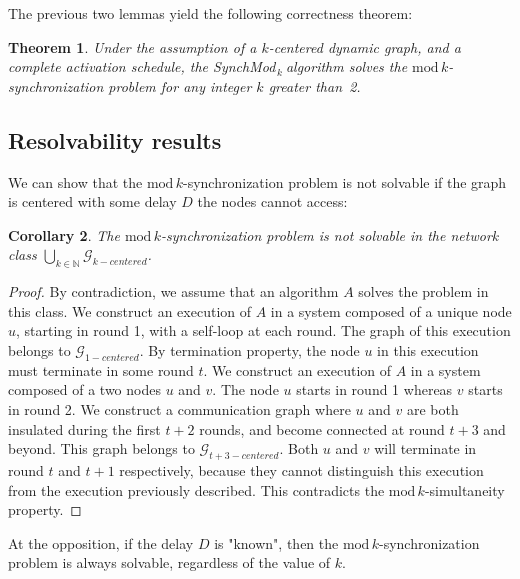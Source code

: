 \documentclass[11pt,letterpaper]{article}
\newtheorem{thm}{Theorem}
\newtheorem{cor}[thm]{Corollary}
\newcommand{\SM}{{\em SynchMod}$_{\,k}\ $}
\begin{document}
The previous two lemmas yield the following correctness theorem:

\begin{thm} \label{lem:safety} 
	Under the assumption of a $k$-centered dynamic graph, and a complete activation schedule,
	the \SM algorithm solves the $\mathrm{mod}\,k$-synchronization problem for any integer $k$ greater than~2.
\end{thm}

\subsection{Resolvability results}

We can show that the $\mathrm{mod}\,k$-synchronization problem is not solvable if the graph is centered with some delay $D$ the nodes cannot access:

\begin{cor}
	The $\mathrm{mod}\,k$-synchronization problem is not solvable in the network class $\underset{k \in \mathds{N}}{\bigcup} \mathcal{G}_{k-centered}$.
\end{cor}
\begin{proof}
	By contradiction, we assume that an algorithm $A$ solves the problem in this class.
	We construct an execution of $A$ in a system composed of a unique node $u$, starting in round 1, with a self-loop at each round.
	The graph of this execution belongs to $\mathcal{G}_{1-centered}$.
	By termination property, the node $u$ in this execution must terminate in some round $t$.
	We construct an execution of $A$ in a system composed of a two nodes $u$ and $v$. The node $u$ starts in round 1 whereas $v$ starts in round 2.
	We construct a communication graph where $u$ and $v$ are both insulated during the first $t+2$ rounds, and become connected at round $t+3$ and beyond.
	This graph belongs to $\mathcal{G}_{t+3-centered}$.
	Both $u$ and $v$ will terminate in round $t$ and $t+1$ respectively, because they cannot distinguish this execution from the execution previously described.
	This contradicts the $\mathrm{mod}\,k$-simultaneity property.
\end{proof}

At the opposition, if the delay $D$ is "known", then the $\mathrm{mod}\,k$-synchronization problem is always solvable, regardless of the value of $k$.
\end{document}
